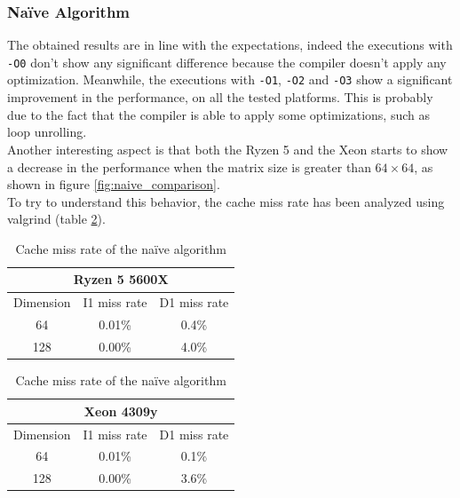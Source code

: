 \documentclass{article}
\begin{document}
\subsubsection{Na\"{i}ve Algorithm}
The obtained results are in line with the expectations, indeed the executions with \texttt{-O0} don't show any significant difference because the compiler 
doesn't apply any optimization. Meanwhile, the executions with \texttt{-O1}, \texttt{-O2} and \texttt{-O3} show a significant improvement in the performance, on all
the tested platforms. This is probably due to the fact that the compiler is able to apply some optimizations, such as loop unrolling. \\
Another interesting aspect is that both the Ryzen 5 and the Xeon starts to show a decrease in the performance when the matrix size is greater than $64 \times 64$, 
as shown in figure \ref{fig:naive_comparison}. \\
To try to understand this behavior, the cache miss rate has been analyzed using valgrind (table \ref{tab:naive_cache_miss}). \\ 
\begin{table}[h]
    \centering
    \begin{tabular}{|c|c|c|}
    \hline
    \multicolumn{3}{|c|}{\textbf{Ryzen 5 5600X}} \\
    \hline
    Dimension            & I1 miss rate & D1 miss rate \\ \hline
    64                   & 0.01\%       & 0.4\%        \\ \hline
    128                  & 0.00\%       & 4.0\%        \\ \hline 
    \end{tabular}
    \hspace{2em}
    \begin{tabular}{|c|c|c|}
        \hline
        \multicolumn{3}{|c|}{\textbf{Xeon 4309y}} \\
        \hline
        Dimension            & I1 miss rate & D1 miss rate \\ \hline
        64                   & 0.01\%       & 0.1\%        \\ \hline
        128                  & 0.00\%       & 3.6\%        \\ \hline 
    \end{tabular}
    \caption{Cache miss rate of the na\"{i}ve algorithm}
    \label{tab:naive_cache_miss}
\end{table}
\end{document}
